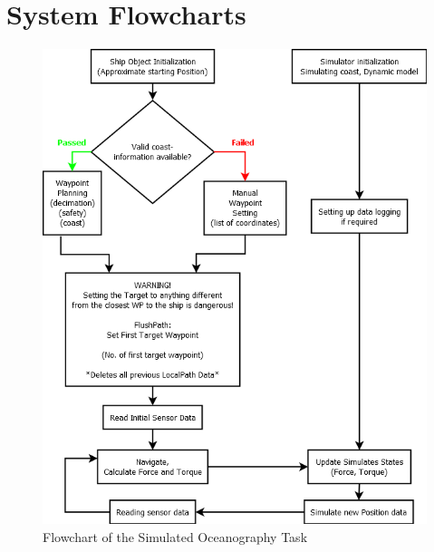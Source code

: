 \appendix
\chapter{System Flowcharts}
\label{chap:schema}

\begin{figure}
\centering

\includegraphics[width = \textwidth]{img/HLIFigures/System-Simulation_Interactions.png}
\caption{Flowchart of the Simulated Oceanography Task}
\label{fig:SimFlowchart}
\end{figure}

